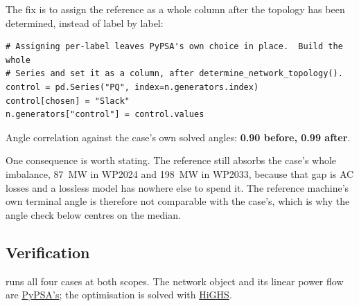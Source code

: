 \documentclass[11pt,a4paper]{article}
\begin{document}
The fix is to assign the reference as a whole column after the topology has
been determined, instead of label by label:

\begin{lstlisting}
# Assigning per-label leaves PyPSA's own choice in place.  Build the whole
# Series and set it as a column, after determine_network_topology().
control = pd.Series("PQ", index=n.generators.index)
control[chosen] = "Slack"
n.generators["control"] = control.values
\end{lstlisting}

Angle correlation against the case's own solved angles: \textbf{0.90 before,
0.99 after}.

One consequence is worth stating. The reference still absorbs the case's whole
imbalance, 87~MW in WP2024 and 198~MW in WP2033, because that gap is AC losses
and a lossless model has nowhere else to spend it. The reference machine's own
terminal angle is therefore not comparable with the case's, which is why the
angle check below centres on the median.


\subsection{Verification}
\label{sec:verify}

 runs all four cases at both scopes. The
network object and its linear power flow are \href{https://doi.org/10.5334/jors.188}{PyPSA's}; the optimisation is solved
with \href{https://doi.org/10.1007/s12532-017-0130-5}{HiGHS}.
\end{document}

